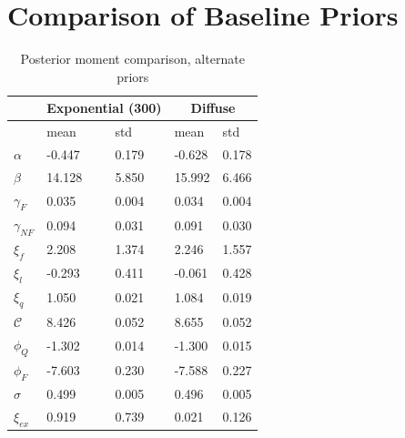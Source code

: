 \clearpage 

\section{Comparison of Baseline Priors} 
\label{sec:prior_comp}

\begin{table}[!ht]
    \centering
    \begin{tabular}{lllll}
        \hline
         & \multicolumn{2}{c}{Exponential (300)}        & \multicolumn{2}{c}{Diffuse} \\ \hline                            & mean    & std   & mean       & std    \\ \hline \hline
         $\alpha$             & -0.447 & 0.179 & -0.628 & 0.178 \\ 
         $\beta$              & 14.128 & 5.850 & 15.992 & 6.466 \\ 
         $\gamma_{F}$         & 0.035  & 0.004 & 0.034  & 0.004 \\ 
         $\gamma_{NF}$        & 0.094  & 0.031 & 0.091  & 0.030 \\ 
         $\xi_f$              & 2.208  & 1.374 & 2.246  & 1.557 \\ 
         $\xi_l$              & -0.293 & 0.411 & -0.061 & 0.428 \\ 
         $\xi_q$              & 1.050  & 0.021 & 1.084  & 0.019 \\ 
         $\mathcal{C}$        & 8.426  & 0.052 & 8.655  & 0.052 \\ 
         $\phi_Q$             & -1.302 & 0.014 & -1.300 & 0.015 \\ 
         $\phi_F$             & -7.603 & 0.230 & -7.588 & 0.227 \\ 
         $\sigma$             & 0.499  & 0.005 & 0.496  & 0.005 \\ 
         $\xi_{ex}$           & 0.919  & 0.739 & 0.021  & 0.126 \\ \hline 
    \end{tabular}                              
    \caption{Posterior moment comparison, alternate priors}
    \label{tab:prior_comp}
\end{table}
